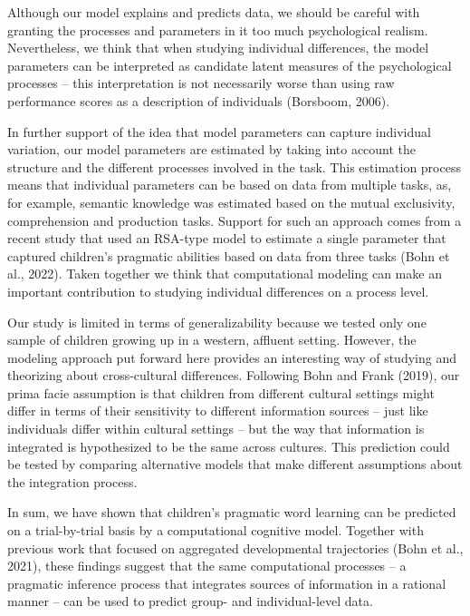 \documentclass[
  man,floatsintext]{apa6}
\begin{document}
Although our model explains and predicts data, we should be careful with granting the processes and parameters in it too much psychological realism. Nevertheless, we think that when studying individual differences, the model parameters can be interpreted as candidate latent measures of the psychological processes -- this interpretation is not necessarily worse than using raw performance scores as a description of individuals (Borsboom, 2006).

In further support of the idea that model parameters can capture individual variation, our model parameters are estimated by taking into account the structure and the different processes involved in the task. This estimation process means that individual parameters can be based on data from multiple tasks, as, for example, semantic knowledge was estimated based on the mutual exclusivity, comprehension and production tasks. Support for such an approach comes from a recent study that used an RSA-type model to estimate a single parameter that captured children's pragmatic abilities based on data from three tasks (Bohn et al., 2022). Taken together we think that computational modeling can make an important contribution to studying individual differences on a process level.

Our study is limited in terms of generalizability because we tested only one sample of children growing up in a western, affluent setting. However, the modeling approach put forward here provides an interesting way of studying and theorizing about cross-cultural differences. Following Bohn and Frank (2019), our prima facie assumption is that children from different cultural settings might differ in terms of their sensitivity to different information sources -- just like individuals differ within cultural settings -- but the way that information is integrated is hypothesized to be the same across cultures. This prediction could be tested by comparing alternative models that make different assumptions about the integration process.

In sum, we have shown that children's pragmatic word learning can be predicted on a trial-by-trial basis by a computational cognitive model. Together with previous work that focused on aggregated developmental trajectories (Bohn et al., 2021), these findings suggest that the same computational processes -- a pragmatic inference process that integrates sources of information in a rational manner -- can be used to predict group- and individual-level data.

\newpage
\end{document}
